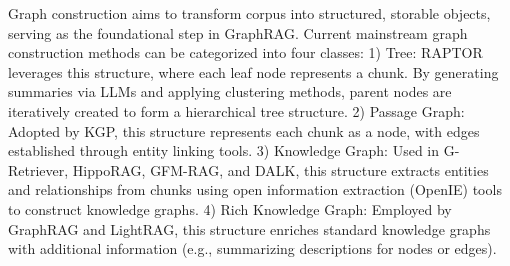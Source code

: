 \documentclass{article}
\begin{document}
\begin{table}[h]
\caption{Comparison of graph construction process.}
\label{graph}
\end{table}
Graph construction aims to transform corpus into structured, storable objects, serving as the foundational step in GraphRAG. Current mainstream graph construction methods can be categorized into four classes: 1) Tree: RAPTOR leverages this structure, where each leaf node represents a chunk. By generating summaries via LLMs and applying clustering methods, parent nodes are iteratively created to form a hierarchical tree structure. 2) Passage Graph: Adopted by KGP, this structure represents each chunk as a node, with edges established through entity linking tools. 3) Knowledge Graph: Used in G-Retriever, HippoRAG, GFM-RAG, and DALK, this structure extracts entities and relationships from chunks using open information extraction (OpenIE) tools to construct knowledge graphs. 4) Rich Knowledge Graph: Employed by GraphRAG and LightRAG, this structure enriches standard knowledge graphs with additional information (e.g., summarizing descriptions for nodes or edges).
\end{document}
